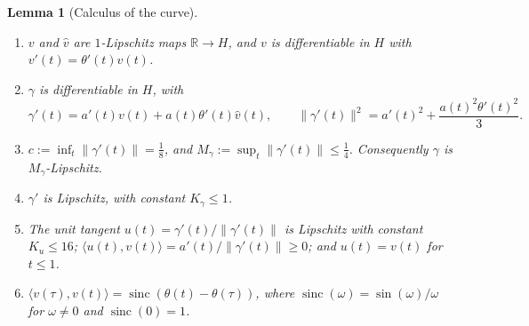 \documentclass[11pt]{article}
\newcommand{\R}{\mathbb R}
\newcommand{\norm}[1]{\lVert #1\rVert}
\newcommand{\ip}[2]{\langle #1,#2\rangle}
\DeclareMathOperator{\sinc}{sinc}
\newtheorem{lemma}[theorem]{Lemma}
\theoremstyle{definition}
\numberwithin{equation}{section}
\begin{document}
\begin{lemma}[Calculus of the curve]\label{aux:calc}
\begin{enumerate}[label=(\roman*)]
\item \(v\) and \(\hat v\) are \(1\)-Lipschitz maps \(\R\to H\), and \(v\) is
differentiable in \(H\) with \(v'(t)=\theta'(t)\hat v(t)\).
\item \(\gamma\) is differentiable in \(H\), with
\[
 \gamma'(t)=a'(t)v(t)+a(t)\theta'(t)\hat v(t),
 \qquad
 \norm{\gamma'(t)}^2=a'(t)^2+\frac{a(t)^2\theta'(t)^2}{3}.
\]
\item \(c:=\inf_t\norm{\gamma'(t)}=\frac18\), and
\(M_\gamma:=\sup_t\norm{\gamma'(t)}\le\frac14\). Consequently \(\gamma\) is
\(M_\gamma\)-Lipschitz.
\item \(\gamma'\) is Lipschitz, with constant \(K_\gamma\le1\).
\item The unit tangent \(u(t)=\gamma'(t)/\norm{\gamma'(t)}\) is Lipschitz with
constant \(K_u\le16\); \(\ip{u(t)}{v(t)}=a'(t)/\norm{\gamma'(t)}\ge0\); and
\(u(t)=v(t)\) for \(t\le1\).
\item \(\ip{v(\tau)}{v(t)}=\sinc(\theta(t)-\theta(\tau))\), where
\(\sinc(\omega)=\sin(\omega)/\omega\) for \(\omega\ne0\) and \(\sinc(0)=1\).
\end{enumerate}
\end{lemma}
\end{document}
